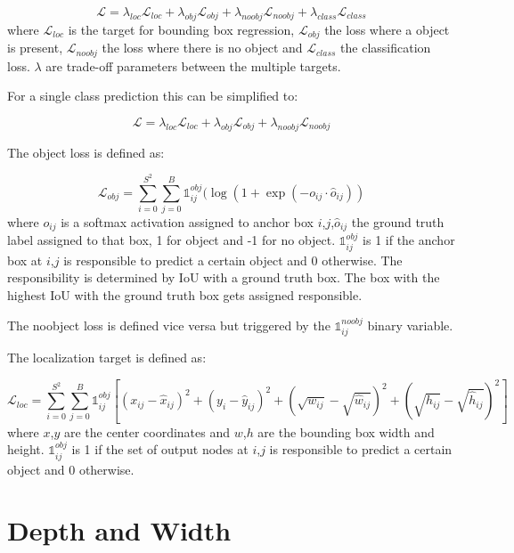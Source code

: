 	\begin{equation}
	\mathcal{L} = \lambda_{loc}\mathcal{L}_{loc} + \lambda_{obj}\mathcal{L}_{obj} + \lambda_{noobj}\mathcal{L}_{noobj} + \lambda_{class}\mathcal{L}_{class}
	\end{equation}
	where $\mathcal{L}_{loc}$ is the target for bounding box regression, $\mathcal{L}_{obj}$ the loss where a object is present, $\mathcal{L}_{noobj}$ the loss where there is no object and $\mathcal{L}_{class}$ the classification loss. $\lambda$ are trade-off parameters between the multiple targets.
	
	For a single class prediction this can be simplified to:
	
	\begin{equation}
	\mathcal{L} = \lambda_{loc}\mathcal{L}_{loc} + \lambda_{obj}\mathcal{L}_{obj} + \lambda_{noobj}\mathcal{L}_{noobj}
	\end{equation}
	
	The object loss is defined as:
	
	\begin{equation}
		\mathcal{L}_{obj} = \sum_{i=0}^{S^2}\sum_{j=0}^B \mathbb{1}_{ij}^{obj}(\log(1+\exp(-o_{ij} \cdot \hat o_{ij}))
	\end{equation}
	where $o_{ij}$ is a softmax activation assigned to anchor box $i$,$j$,$\hat o_{ij}$ the ground truth label assigned to that box, 1 for object and -1 for no object.  $\mathbb{1}_{ij}^{obj}$ is 1 if the anchor box at $i$,$j$ is responsible to predict a certain object and 0 otherwise. The responsibility is determined by \ac{IoU} with a ground truth box. The box with the highest \ac{IoU} with the ground truth box gets assigned responsible.
	
	The noobject loss is defined vice versa but triggered by the $\mathbb{1}_{ij}^{noobj}$ binary variable.
	
	The localization target is defined as:
	
	\begin{equation}
		\mathcal{L}_{loc} = \sum_{i=0}^{S^2}\sum_{j=0}^B \mathbb{1}_{ij}^{obj}[(x_{ij}-\hat{x}_{ij})^2 + (y_i-\hat{y}_{ij})^2  + (\sqrt{w_{ij}}-\sqrt{\hat{w}_{ij}})^2 +(\sqrt{h_{ij}}-\sqrt{\hat{h}_{ij}})^2 ]
	\end{equation}
	where $x$,$y$ are the center coordinates and $w$,$h$ are the bounding box width and height. $\mathbb{1}_{ij}^{obj}$ is 1 if the set of output nodes at $i$,$j$ is responsible to predict a certain object and 0 otherwise. 
	
	\section{Depth and Width}
	
